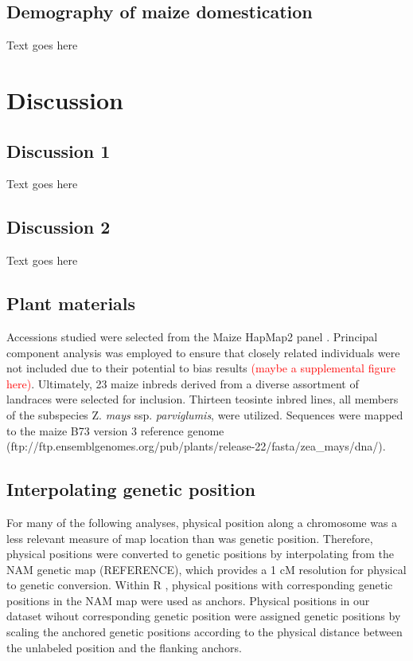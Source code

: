 \documentclass{pnastwo}
\begin{document}
\begin{article}
\subsection{Demography of maize domestication}
Text goes here


\section{Discussion}
\subsection{Discussion 1}
Text goes here

\subsection{Discussion 2}
Text goes here

\begin{materials}
\subsection{Plant materials}
Accessions studied were selected from the Maize HapMap2
panel \cite{hapmap2} . Principal component analysis was employed to ensure that
closely related individuals were not included due to their potential
to bias results \textcolor{red}{(maybe a supplemental figure here)}. Ultimately, 23 maize inbreds derived from a diverse
assortment of landraces were selected for inclusion. Thirteen teosinte
inbred lines, all members of the subspecies Z. \emph{mays}
ssp. \emph{parviglumis}, were utilized. Sequences were mapped to the
maize B73 version 3 reference genome \cite{maizeGenome}
(ftp://ftp.ensemblgenomes.org/pub/plants/release-22/fasta/zea\_mays/dna/).

\subsection{Interpolating genetic position}
For many of the following analyses, physical position along a
chromosome was a less relevant measure of map location than was genetic
position. Therefore, physical positions were converted to genetic
positions by interpolating from the NAM genetic map (REFERENCE), which
provides a 1 cM resolution for physical to genetic conversion. Within
R \cite{R}, physical positions with corresponding genetic positions in
the NAM map were used as anchors. Physical positions in our dataset
wihout corresponding genetic position were assigned genetic positions by scaling
the anchored genetic positions according to the physical distance
between the unlabeled position and the flanking anchors.


\end{materials}
\end{article}
\end{document}
